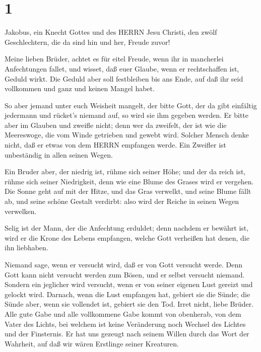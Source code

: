 \hypertarget{section}{%
\section{1}\label{section}}

 Jakobus, ein Knecht Gottes und des HERRN Jesu Christi, den
zwölf Geschlechtern, die da sind hin und her, Freude zuvor!

 Meine lieben Brüder, achtet es für eitel Freude, wenn ihr
in mancherlei Anfechtungen fallet,  und wisset, daß euer
Glaube, wenn er rechtschaffen ist, Geduld wirkt.  Die Geduld
aber soll festbleiben bis ans Ende, auf daß ihr seid vollkommen und ganz
und keinen Mangel habet.

 So aber jemand unter euch Weisheit mangelt, der bitte Gott,
der da gibt einfältig jedermann und rücket's niemand auf, so wird sie
ihm gegeben werden.  Er bitte aber im Glauben und zweifle
nicht; denn wer da zweifelt, der ist wie die Meereswoge, die vom Winde
getrieben und gewebt wird.  Solcher Mensch denke nicht, daß
er etwas von dem HERRN empfangen werde.  Ein Zweifler ist
unbeständig in allen seinen Wegen.

 Ein Bruder aber, der niedrig ist, rühme sich seiner Höhe;
 und der da reich ist, rühme sich seiner Niedrigkeit, denn
wie eine Blume des Grases wird er vergehen.  Die Sonne geht
auf mit der Hitze, und das Gras verwelkt, und seine Blume fällt ab, und
seine schöne Gestalt verdirbt: also wird der Reiche in seinen Wegen
verwelken.

 Selig ist der Mann, der die Anfechtung erduldet; denn
nachdem er bewährt ist, wird er die Krone des Lebens empfangen, welche
Gott verheißen hat denen, die ihn liebhaben.

 Niemand sage, wenn er versucht wird, daß er von Gott
versucht werde. Denn Gott kann nicht versucht werden zum Bösen, und er
selbst versucht niemand.  Sondern ein jeglicher wird
versucht, wenn er von seiner eigenen Lust gereizt und gelockt wird.
 Darnach, wenn die Lust empfangen hat, gebiert sie die
Sünde; die Sünde aber, wenn sie vollendet ist, gebiert sie den Tod.
 Irret nicht, liebe Brüder.  Alle gute Gabe
und alle vollkommene Gabe kommt von obenherab, von dem Vater des Lichts,
bei welchem ist keine Veränderung noch Wechsel des Lichtes und der
Finsternis.  Er hat uns gezeugt nach seinem Willen durch
das Wort der Wahrheit, auf daß wir wären Erstlinge seiner Kreaturen.

